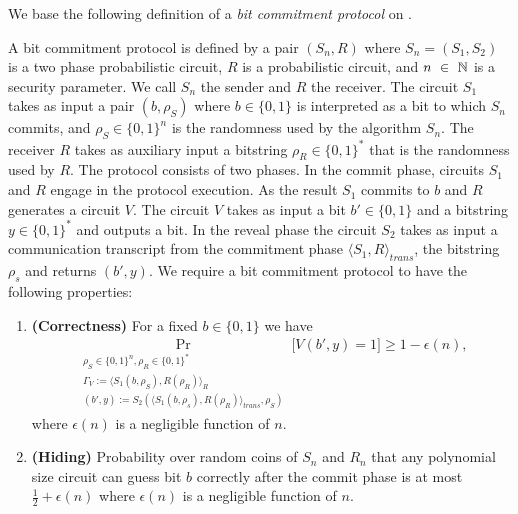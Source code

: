 We base the following definition of a \textit{bit commitment protocol} on \cite{LectureNotesComThCrypto}.
\begin{definition}
  \label{def:bit_commitment}
A \textnormal{bit commitment protocol} is defined by a pair $(S_n, R)$
where $S_n = (S_1, S_2)$ is a two phase probabilistic circuit, $R$ is a probabilistic circuit, and
$n~\in~\mathbb{N}$ is a security parameter.
We call $S_n$ the sender and $R$ the receiver. The circuit $S_1$ takes as input a pair $(b, \rho_S)$
where $b \in \{0,1\}$ is interpreted as a bit to which $S_n$ commits, and $\rho_S \in \{0,1\}^{n}$ is the randomness used by the algorithm $S_n$.
The receiver $R$ takes as auxiliary input a bitstring $\rho_R \in \{0,1\}^{*}$ that is the randomness used by $R$.
The protocol consists of two phases. In the \textnormal{commit phase}, circuits $S_1$ and $R$ engage in the protocol execution.
As the result $S_1$ commits to $b$ and $R$ generates a circuit $V$.
The circuit $V$ takes as input a bit $b' \in \{0,1\}$ and a bitstring $y \in \{0,1\}^{*}$ and outputs a bit.
In the \textnormal{reveal phase} the circuit $S_2$ takes as input a communication transcript from the commitment phase
$\langle S_1, R \rangle_{\mathit{trans}}$, the bitstring $\rho_s$ and returns $(b', y)$.
We require a bit commitment protocol to have the following properties:
\begin{enumerate}[]
\item{\textnormal{\textbf{(Correctness)}}} For a fixed $b \in \{0,1\}$ we have
  \begin{align*}
    \underset{\substack{\rho_S \in \{0,1\}^{n}, \rho_R \in \{0,1\}^{*} \\
        \Gamma_V := \langle S_1(b,\rho_S), R(\rho_R) \rangle_{R} \\
        (b',y) := S_2(\langle S_1(b,\rho_s), R(\rho_R) \rangle_{\mathit{trans}},\rho_S)}}{\Pr}\Big[V(b',y) = 1 \Big] \geq 1 - \epsilon(n),
  \end{align*}
where $\epsilon(n)$ is a negligible function of $n$.
\item{\textnormal{\textbf{(Hiding)}}}
  Probability over random coins of $S_n$ and $R_n$ that any polynomial size circuit
  can guess bit $b$ correctly after the commit phase is at most $\frac{1}{2} + \epsilon(n)$ where $\epsilon(n)$ is a negligible function of $n$.

\end{enumerate}
\end{definition}
